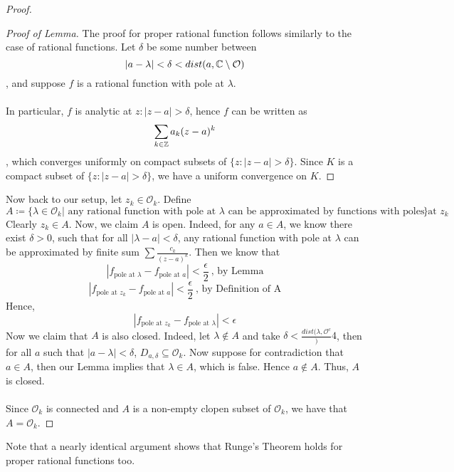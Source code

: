 \begin{proof}
\begin{proof}[Proof of Lemma]
    The proof for proper rational function follows similarly to the case of rational functions. Let $\delta$ be some number between
    \[|a - \lambda| < \delta < dist(a, \mathbb{C} \setminus \mathcal{O})\]
    , and suppose $f$ is a rational function with pole at $\lambda$.\\\\
    In particular, $f$ is analytic at $z: |z - a| > \delta$, hence $f$ can be written as
    \[\sum_{k \in \mathbb{Z}} a_k (z - a)^k\]
    , which converges uniformly on compact subsets of $\{z: |z - a| > \delta\}$. Since $K$ is a compact subset of $\{z: |z - a| > \delta\}$, we have a uniform convergence on $K$.
    \end{proof}
Now back to our setup, let $z_k \in \mathcal{O}_k$. Define
\[A \coloneqq \{\lambda \in \mathcal{O}_k | \text{ any rational function with pole at $\lambda$ can be approximated by functions with poles at $z_k$}\}\]
Clearly $z_k \in A$. Now, we claim $A$ is open. Indeed, for any $a \in A$, we know there exist $\delta > 0$, such that for all $|\lambda - a| < \delta$, any rational function with pole at $\lambda$ can be approximated by finite sum $\sum \frac{c_k}{(z - a)^k}$. Then we know that
\[|f_{\text{pole at $\lambda$}} - f_{\text{pole at $a$}}| < \frac{\epsilon}{2}\ \text{, by Lemma}\]
\[|f_{\text{pole at $z_k$}} - f_{\text{pole at $a$}}| < \frac{\epsilon}{2}\ \text{, by Definition of A}\]
Hence, 
\[|f_{\text{pole at $z_k$}} - f_{\text{pole at $\lambda$}}| < \epsilon\]
Now we claim that $A$ is also closed. Indeed, let $\lambda \notin A$ and take $\delta < \frac{dist(\lambda, \mathcal{O}^c}){4}$, then for all $a$ such that $|a - \lambda| < \delta$, $D_{a, \delta} \subseteq \mathcal{O}_k$. Now suppose for contradiction that $a \in A$, then our Lemma implies that $\lambda \in A$, which is false. Hence $a \notin A$. Thus, $A$ is closed.\\\\
Since $\mathcal{O}_k$ is connected and $A$ is a non-empty clopen subset of $\mathcal{O}_k$, we have that $A = \mathcal{O}_k$.
\end{proof}

\begin{remark}
    Note that a nearly identical argument shows that Runge's Theorem holds for proper rational functions too.
\end{remark}